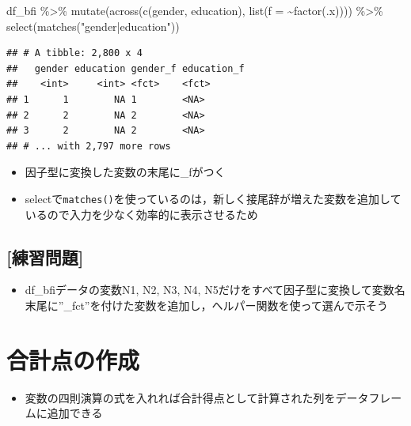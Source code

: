 \documentclass[
  xelatex,ja=standard, b5paper]{bxjsbook}
\newenvironment{Shaded}{\begin{snugshade}}{\end{snugshade}}
\newcommand{\AttributeTok}[1]{\textcolor[rgb]{0.77,0.63,0.00}{#1}}
\newcommand{\FunctionTok}[1]{\textcolor[rgb]{0.00,0.00,0.00}{#1}}
\newcommand{\NormalTok}[1]{#1}
\newcommand{\SpecialCharTok}[1]{\textcolor[rgb]{0.00,0.00,0.00}{#1}}
\newcommand{\StringTok}[1]{\textcolor[rgb]{0.31,0.60,0.02}{#1}}
\providecommand{\tightlist}{%
  \setlength{\itemsep}{0pt}\setlength{\parskip}{0pt}}
\begin{document}
\begin{Shaded}
\begin{Highlighting}[]
\NormalTok{df\_bfi }\SpecialCharTok{\%\textgreater{}\%}
  \FunctionTok{mutate}\NormalTok{(}\FunctionTok{across}\NormalTok{(}\FunctionTok{c}\NormalTok{(gender, education),}
                \FunctionTok{list}\NormalTok{(}\AttributeTok{f =} \SpecialCharTok{\textasciitilde{}}\FunctionTok{factor}\NormalTok{(.x)))) }\SpecialCharTok{\%\textgreater{}\%} 
  \FunctionTok{select}\NormalTok{(}\FunctionTok{matches}\NormalTok{(}\StringTok{"gender|education"}\NormalTok{))   }
\end{Highlighting}
\end{Shaded}

\begin{verbatim}
## # A tibble: 2,800 x 4
##   gender education gender_f education_f
##    <int>     <int> <fct>    <fct>      
## 1      1        NA 1        <NA>       
## 2      2        NA 2        <NA>       
## 3      2        NA 2        <NA>       
## # ... with 2,797 more rows
\end{verbatim}

\begin{itemize}
\tightlist
\item
  因子型に変換した変数の末尾に\_fがつく
\item
  selectで\texttt{matches()}を使っているのは，新しく接尾辞が増えた変数を追加しているので入力を少なく効率的に表示させるため
\end{itemize}

\hypertarget{ux7df4ux7fd2ux554fux984c-11}{%
\subsection{{[}練習問題{]}}\label{ux7df4ux7fd2ux554fux984c-11}}

\begin{itemize}
\tightlist
\item
  df\_bfiデータの変数N1, N2, N3, N4, N5だけをすべて因子型に変換して変数名末尾に''\_fct''を付けた変数を追加し，ヘルパー関数を使って選んで示そう
\end{itemize}

\hypertarget{mu-total}{%
\section{合計点の作成}\label{mu-total}}

\begin{itemize}
\tightlist
\item
  変数の四則演算の式を入れれば合計得点として計算された列をデータフレームに追加できる
\end{itemize}
\end{document}
